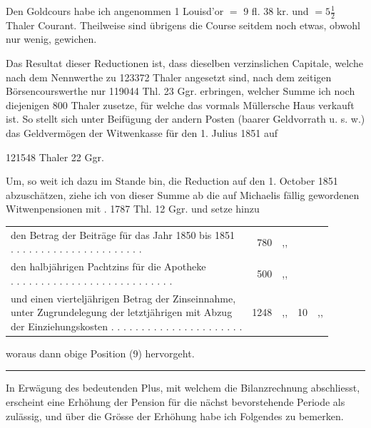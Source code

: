 \noindent\hspace*{\parindent}Den Goldcours habe ich angenommen 1 Louisd’or \(=\) 9 fl. 38 kr. und \(=5\tfrac{1}{2}\) Thaler Courant. Theilweise sind übrigens die Course seitdem noch etwas, obwohl nur wenig, gewichen.

Das Resultat dieser Reductionen ist, dass dieselben verzinslichen Capitale, welche nach dem Nennwerthe zu 123372 Thaler angesetzt sind, nach dem zeitigen Börsencourswerthe nur 119044 Thl. 23 Ggr. erbringen, welcher Summe ich noch diejenigen 800 Thaler zusetze, für welche das vormals Müllersche Haus verkauft ist. So stellt sich unter Beifügung der andern Posten (baarer Geldvorrath u. s. w.) das Geldvermögen der Witwenkasse für den 1. Julius 1851 auf
\begin{center}121548 Thaler 22 Ggr.\end{center}
\noindent\hspace*{\parindent}Um, so weit ich dazu im Stande bin, die Reduction auf den 1. October 1851 abzuschätzen, ziehe ich von dieser Summe ab die auf Michaelis fällig gewordenen Witwenpensionen mit . 1787 Thl. 12 Ggr. und setze hinzu
\begin{center}
\small\setlength{\tabcolsep}{2pt}
\begin{tabular}{l r l r l}
\shortstack[l]{den Betrag der Beiträge für das Jahr 1850 bis 1851\\. . . . . . . . . . . . . . . . . . . . . .}&780&,,&&\\
\shortstack[l]{den halbjährigen Pachtzins für die Apotheke\\. . . . . . . . . . . . . . . . . . . . . . . . . . .}&500&,,&&\\
\shortstack[l]{und einen vierteljährigen Betrag der Zinseinnahme,\\unter Zugrundelegung der letztjährigen mit Abzug\\der Einziehungskosten . . . . . . . . . . . . . . . . . . . . . .}&1248&,,&10&,,
\end{tabular}
\end{center}
\noindent woraus dann obige Position (9) hervorgeht.

\begin{center}\rule{.28\linewidth}{.3pt}\end{center}

In Erwägung des bedeutenden Plus, mit welchem die Bilanzrechnung abschliesst, erscheint eine Erhöhung der Pension für die nächst bevorstehende Periode als zulässig, und über die Grösse der Erhöhung habe ich Folgendes zu bemerken.

